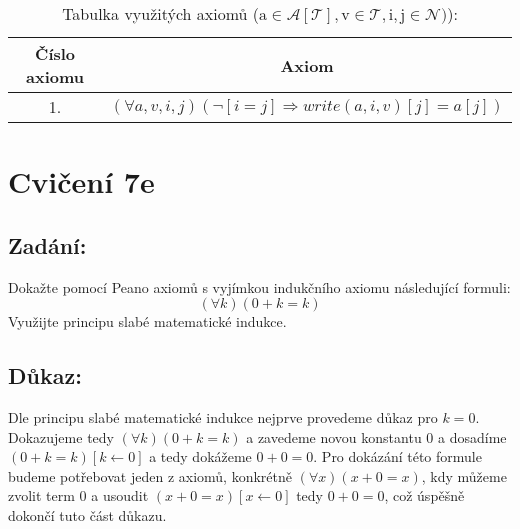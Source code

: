 \documentclass{article}
\begin{document}
\begin{table}[H]\centering

    \caption{Tabulka využitých axiomů ($\mathrm{a} \in \mathcal{A[T]}, \mathrm{v} \in \mathcal{T}, \mathrm{i, j} \in  \mathcal{N} )$):}

\begin{tabular}{|c|c|}
    
    
        \hline \textbf{Číslo axiomu} & \textbf{Axiom} \\ \hline \hline
    	1. & $(\forall a, v, i, j ) ( \neg [i = j] \Rightarrow write(a, i, v)[j] = a[j])$ \\ \hline
    	
    	\end{tabular}
\end{table}

\section{Cvičení 7e}

\subsection{Zadání:}

Dokažte pomocí Peano axiomů s vyjímkou indukčního axiomu následující formuli:
$$(\forall k )( 0 + k = k)$$
Využijte principu slabé matematické indukce.


\subsection{Důkaz:}

Dle principu slabé matematické indukce nejprve provedeme důkaz pro $k = 0$. Dokazujeme tedy $(\forall k )( 0 + k = k)$ a zavedeme novou konstantu $0$ a dosadíme $( 0 + k = k)[k \leftarrow 0]$ a tedy dokážeme $0 + 0 = 0$. Pro dokázání této formule budeme potřebovat jeden z axiomů, konkrétně $(\forall x)(x + 0 = x)$, kdy můžeme zvolit term $0$ a usoudit  $(x + 0 = x)[x \leftarrow 0]$ tedy $0 + 0 = 0$, což úspěšně dokončí tuto část důkazu.
\end{document}
